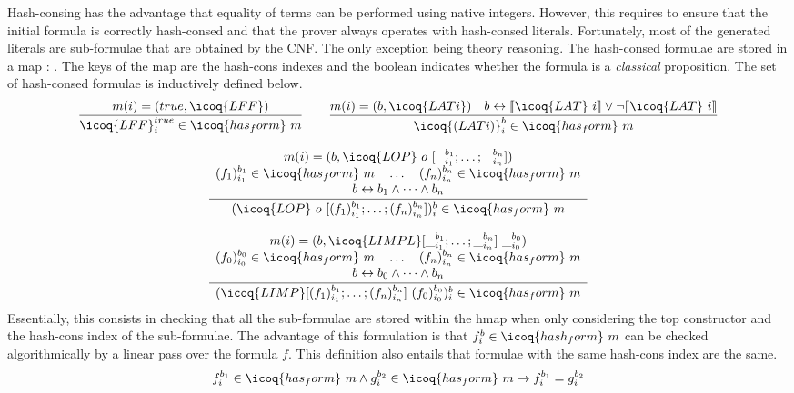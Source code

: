 \documentclass[utf8,a4paper,UKenglish,cleveref, autoref, thm-restate]{lipics-v2019}
\begin{document}
Hash-consing has the advantage that equality of terms can be performed
using native integers. However, this requires to ensure that the
initial formula is correctly hash-consed and that the prover always
operates with hash-consed literals. Fortunately, most of the generated
literals are sub-formulae that are obtained by the CNF. The only
exception being theory reasoning.
%
The hash-consed formulae are stored in a map  :
.  The keys of the map are the hash-cons indexes
and the boolean indicates whether the formula is a \emph{classical}
proposition. The set of hash-consed formulae  is
inductively defined below.
\[
  \begin{array}{c}
  \dfrac{m(i) = (true,\icoq{LFF})}
  {\icoq{LFF}_i^{true} \in \icoq{has_form}\ m }
  \qquad
  \dfrac{m(i) = (b,\icoq{LAT i}) \quad b \leftrightarrow \llbracket \icoq{LAT}\ i \rrbracket \lor \neg \llbracket \icoq{LAT}\ i \rrbracket }
  {\icoq{(LAT i)}_i^b \in \icoq{has_form}\ m }\\
    \\
    \dfrac{
    \begin{array}{c}
      m(i) = (b,\icoq{LOP}\ o\ [\__{i_1}^{b_1} ; \dots ; \__{i_n}^{b_n}]) \\
      (f_1)_{i_1}^{b_1} \in \icoq{has_form}\ m \quad \dots \quad (f_n)_{i_n}^{b_n} \in  \icoq{has_form}\ m\\
      b \leftrightarrow b_1 \land \dots \land b_n
    \end{array}}
    {(\icoq{LOP}\ o\  [(f_1)_{i_1}^{b_1}; \dots ; (f_n)_{i_n}^{b_n}])_i^b \in  \icoq{has_form}\ m
    }\\
    \\
    \dfrac{
    \begin{array}{c}
      m(i) = (b,\icoq{LIMPL} [\__{i_1}^{b_1} ; \dots ; \__{i_n}^{b_n}]\ \__{i_0}^{b_0}) \\
      (f_0)_{i_0}^{b_0} \in \icoq{has_form}\ m \quad \dots \quad (f_n)_{i_n}^{b_n} \in  \icoq{has_form}\ m\\
      b \leftrightarrow b_0 \land \dots \land b_n
    \end{array}}
    {(\icoq{LIMP} [(f_1)_{i_1}^{b_1}; \dots ; (f_n)_{i_n}^{b_n}]\ (f_0)_{i_0}^{b_0})_i^b \in  \icoq{has_form}\ m
    }
  \end{array}    
\]
Essentially, this consists in checking that all the sub-formulae are
stored within the hmap  when only considering the top
constructor and the hash-cons index of the sub-formulae.
%
The advantage of this formulation is that
$f_i^b \in \icoq{hash_form}\ m$ can be checked algorithmically by a
linear pass over the formula $f$.
%
This definition also entails that formulae with the same hash-cons index are the same.
\[
f_i^{b_1} \in \icoq{has_form}\ m \land g_i^{b_2} \in \icoq{has_form}\ m \to  f_i^{b_1} = g_i^{b_2}
\]
\end{document}
